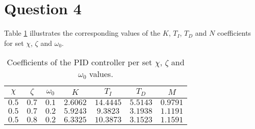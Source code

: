 \section{Question 4}

Table \ref{tbl:Q4} illustrates the corresponding values of the $K$, $T_I$, $T_D$
and $N$ coefficients for set $\chi$, $\zeta$ and $\omega_0$.

\begin{table}[H]\centering
  \begin{tabular}{ccc|cccc}
  $\chi$  & $\zeta$  & $\omega_0$  & $K$       & $T_I$      & $T_D$  & $M$          \\ \hline
  $0.5$   & $0.7$    & $0.1$       & $2.6062$  & $14.4445$  & $5.5143$  & $0.9791$  \\ \hline
  $0.5$   & $0.7$    & $0.2$       & $5.9243$  & $9.3823$   & $3.1938$  & $1.1191$  \\ \hline
  $0.5$   & $0.8$    & $0.2$       & $6.3325$  & $10.3873$  & $3.1523$  & $1.1591$  \\ \hline
  \end{tabular}
  \caption{Coefficients of the PID controller per set $\chi$, $\zeta$ and
    $\omega_0$ values.}
  \label{tbl:Q4}
\end{table}
